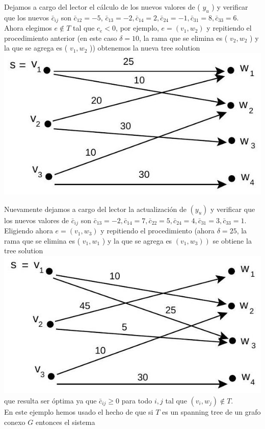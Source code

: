 \documentclass[10pt]{article}
\begin{document}
Dejamos a cargo del lector el cálculo de los nuevos valores de ( $y_{u}$ ) y verificar que los nuevos $\bar{c}_{i j}$ son $\bar{c}_{12}=-5$, $\bar{c}_{13}=-2, \bar{c}_{14}=2, \bar{c}_{24}=-1, \bar{c}_{31}=8, \bar{c}_{33}=6$.\\
Ahora elegimos $e \notin T$ tal que $c_{e}<0$, por ejemplo, $e=\left(v_{1}, w_{2}\right)$ y repitiendo el procedimiento anterior (en este caso $\delta=10$, la rama que se elimina es ( $v_{2}, w_{2}$ ) y la que se agrega es ( $v_{1}, w_{2}$ )) obtenemos la nueva tree solution\\
\includegraphics[max width=\textwidth, center]{2025_09_05_955b52bfc43174a24a9ag-31(2)}

Nuevamente dejamos a cargo del lector la actualización de $\left(y_{u}\right)$ y verificar que los nuevos valores de $\bar{c}_{i j}$ son $\bar{c}_{13}=-2, \bar{c}_{14}=7, \bar{c}_{22}=5, \bar{c}_{24}=4, \bar{c}_{31}=3, \bar{c}_{33}=1$.\\
Eligiendo ahora $e=\left(v_{1}, w_{3}\right)$ y repitiendo el procedimiento (ahora $\delta=25$, la rama que se elimina es ( $v_{1}, w_{1}$ ) y la que se agrega es $\left.\left(v_{1}, w_{3}\right)\right)$ se obtiene la tree solution\\
\includegraphics[max width=\textwidth, center]{2025_09_05_955b52bfc43174a24a9ag-31(1)}\\
que resulta ser óptima ya que $\bar{c}_{i j} \geq 0$ para todo $i, j$ tal que $\left(v_{i}, w_{j}\right) \notin T$.\\
En este ejemplo hemos usado el hecho de que si $T$ es un spanning tree de un grafo conexo $G$ entonces el sistema
\end{document}
